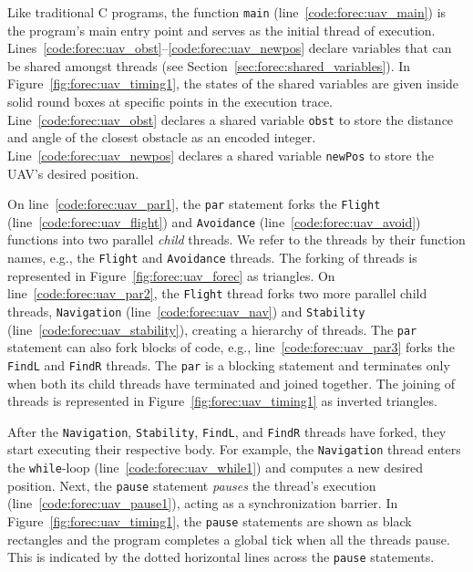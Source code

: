 Like traditional C programs, the function \verb$main$ 
(line~\ref{code:forec:uav_main}) is the program's main 
entry point and serves as the initial
thread of execution. Lines~\ref{code:forec:uav_obst}--\ref{code:forec:uav_newpos}
declare variables that can be shared amongst 
threads (see Section~\ref{sec:forec:shared_variables}).
In Figure~\ref{fig:forec:uav_timing1}, the states of 
the shared variables are given inside solid round
boxes at specific points in the execution trace.
Line~\ref{code:forec:uav_obst} declares a shared
variable \verb$obst$ to store the distance and angle 
of the closest obstacle as an encoded integer.
Line~\ref{code:forec:uav_newpos} declares a shared variable
\verb$newPos$ to store the UAV's desired position. 

On line~\ref{code:forec:uav_par1}, the \verb$par$ statement
forks the \verb$Flight$ (line~\ref{code:forec:uav_flight})
and \verb$Avoidance$ (line~\ref{code:forec:uav_avoid})
functions into two parallel \emph{child} threads. We refer
to the threads by their function names, e.g., the
\verb$Flight$ and \verb$Avoidance$ threads. 
The forking of threads is represented in
Figure~\ref{fig:forec:uav_forec} as triangles.
On line~\ref{code:forec:uav_par2}, the \verb$Flight$ thread
forks two more parallel child threads, \verb$Navigation$
(line~\ref{code:forec:uav_nav}) and \verb$Stability$
(line~\ref{code:forec:uav_stability}), creating a hierarchy
of threads. The \verb$par$ statement can also fork blocks of
code, e.g., line~\ref{code:forec:uav_par3} forks the 
\verb$FindL$ and \verb$FindR$ threads. The \verb$par$
is a blocking statement and terminates only when both its
child threads have terminated and joined together. The
joining of threads is represented in
Figure~\ref{fig:forec:uav_timing1} as inverted triangles. 

After the \verb$Navigation$, \verb$Stability$, \verb$FindL$,
and \verb$FindR$ threads have forked, they start executing
their respective body. For example, the \verb$Navigation$
thread enters the \verb$while$-loop
(line~\ref{code:forec:uav_while1}) and computes a new
desired position. Next, the
\verb$pause$ statement \emph{pauses} the thread's execution
(line~\ref{code:forec:uav_pause1}), acting as a
synchronization barrier. In
Figure~\ref{fig:forec:uav_timing1}, the \verb$pause$
statements are shown as black rectangles and the program
completes a global tick when all the threads pause.
This is indicated by the dotted horizontal lines across the
\verb$pause$ statements.

